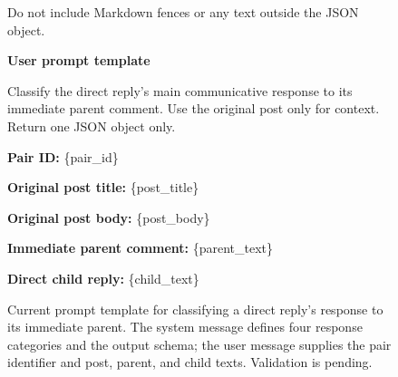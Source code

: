 \begin{figure}[p]
\begin{tcolorbox}[colback=gray!5, colframe=black!50, title=RQ2 Response Annotation Prompt,
width=\textwidth, fontupper=\small, left=2mm, right=2mm, top=2mm, bottom=2mm]
Do not include Markdown fences or any text outside the JSON object.

\textbf{User prompt template}

Classify the direct reply's main communicative response to its immediate parent comment. Use the original post only for context. Return one JSON object only.

\textbf{Pair ID:} \{pair\_id\}

\textbf{Original post title:} \{post\_title\}

\textbf{Original post body:} \{post\_body\}

\textbf{Immediate parent comment:} \{parent\_text\}

\textbf{Direct child reply:} \{child\_text\}

\end{tcolorbox}
\caption{Current prompt template for classifying a direct reply's response to
its immediate parent. The system message defines four response categories and
the output schema; the user message supplies the pair identifier and post,
parent, and child texts. Validation is pending.}
\label{fig:rq2-prompt}
\end{figure}
